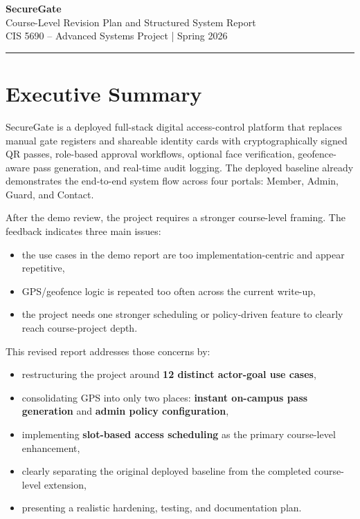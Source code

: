 \documentclass[12pt,letterpaper]{article}
\begin{document}
\begin{center}
    {\LARGE \textbf{SecureGate}} \\[4pt]
    {\large Course-Level Revision Plan and Structured System Report} \\[6pt]
    {\normalsize CIS 5690 -- Advanced Systems Project \quad | \quad Spring 2026} \\[2pt]
\end{center}
\vspace{2pt}
\hrule
\vspace{10pt}

\section{Executive Summary}

SecureGate is a deployed full-stack digital access-control platform that replaces manual gate registers and shareable identity cards with cryptographically signed QR passes, role-based approval workflows, optional face verification, geofence-aware pass generation, and real-time audit logging. The deployed baseline already demonstrates the end-to-end system flow across four portals: Member, Admin, Guard, and Contact.

After the demo review, the project requires a stronger course-level framing. The feedback indicates three main issues:
\begin{itemize}
    \item the use cases in the demo report are too implementation-centric and appear repetitive,
    \item GPS/geofence logic is repeated too often across the current write-up,
    \item the project needs one stronger scheduling or policy-driven feature to clearly reach course-project depth.
\end{itemize}

This revised report addresses those concerns by:
\begin{itemize}
    \item restructuring the project around \textbf{12 distinct actor-goal use cases},
    \item consolidating GPS into only two places: \textbf{instant on-campus pass generation} and \textbf{admin policy configuration},
    \item implementing \textbf{slot-based access scheduling} as the primary course-level enhancement,
    \item clearly separating the original deployed baseline from the completed course-level extension,
    \item presenting a realistic hardening, testing, and documentation plan.
\end{itemize}
\end{document}
